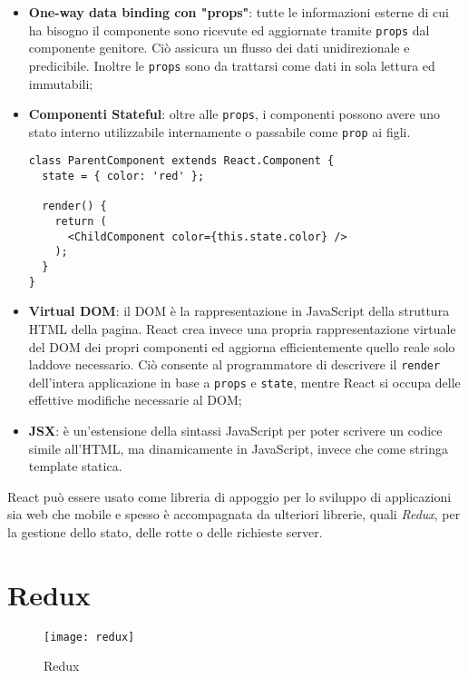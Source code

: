 \begin{itemize}
  \item \textbf{One-way data binding con "props"}: tutte le informazioni esterne di cui ha bisogno il componente sono ricevute ed aggiornate tramite \texttt{props} dal componente genitore. Ciò assicura un flusso dei dati unidirezionale e predicibile. Inoltre le \texttt{props} sono da trattarsi come dati in sola lettura ed immutabili;
  \item \textbf{Componenti Stateful}: oltre alle \texttt{props}, i componenti possono avere uno stato interno utilizzabile internamente o passabile come \texttt{prop} ai figli.

  \vfill

    \begin{lstlisting}[language={[Sharp]C}]
class ParentComponent extends React.Component {
  state = { color: 'red' };

  render() {
    return (
      <ChildComponent color={this.state.color} />
    );
  }
}
    \end{lstlisting}

  \item \textbf{Virtual DOM}: il DOM è la rappresentazione in JavaScript della struttura HTML della pagina. React crea invece una propria rappresentazione virtuale del DOM dei propri componenti ed aggiorna efficientemente quello reale solo laddove necessario. Ciò consente al programmatore di descrivere il \texttt{render} dell'intera applicazione in base a \texttt{props} e \texttt{state}, mentre React si occupa delle effettive modifiche necessarie al DOM;
  \item \textbf{JSX}: è un'estensione della sintassi JavaScript per poter scrivere un codice simile all'HTML, ma dinamicamente in JavaScript, invece che come stringa template statica.
\end{itemize}

React può essere usato come libreria di appoggio per lo sviluppo di applicazioni sia web che mobile e spesso è accompagnata da ulteriori librerie, quali \textit{Redux}, per la gestione dello stato, delle rotte o delle richieste server.

\section{Redux}

\begin{figure}[H] 
  \centering 
  \texttt{[image: redux]} 
  \caption{Redux}
\end{figure}

